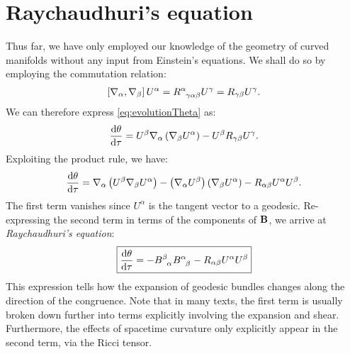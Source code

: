 \documentclass[10pt]{article}
\newcommand{\<}{\langle}
\renewcommand{\>}{\rangle}
\renewcommand{\(}{\left(}
\renewcommand{\)}{\right)}
\renewcommand{\[}{\left[}
\renewcommand{\]}{\right]}
\begin{document}
		\section{Raychaudhuri's equation}
		Thus far, we have only employed our knowledge of the geometry of curved manifolds without any input from Einstein's equations. We shall do so by employing the commutation relation:
		\begin{align}
			\[ \nabla_\alpha, \nabla_\beta \] U^\alpha = \tensor{R}{^\alpha_\gamma_\alpha_\beta} U^\gamma = R_{\gamma\beta} U^\gamma.
		\end{align}
		We can therefore express \eqref{eq:evolutionTheta} as:
		\begin{align}
			\dv{\theta}{\tau} = U^\beta \nabla_\alpha \( \nabla_\beta U^\alpha \) - U^\beta R_{\gamma\beta} U^\gamma.
		\end{align}
		Exploiting the product rule, we have:
		\begin{align}
			\dv{\theta}{\tau} = \nabla_\alpha \( U^\beta \nabla_\beta U^\alpha \) - \( \nabla_\alpha U^\beta \)\( \nabla_\beta U^\alpha \) - R_{\alpha\beta} U^\alpha U^\beta.
		\end{align}
		The first term vanishes since $U^\alpha$ is the tangent vector to a geodesic. Re-expressing the second term in terms of the components of $\vb{B}$, we arrive at \textit{Raychaudhuri's equation}:
		\begin{align}\label{eq:Raychaudhuri}
			\boxed{\dv{\theta}{\tau} = -\tensor{B}{^\beta_\alpha} \tensor{B}{^\alpha_\beta} - R_{\alpha\beta} U^\alpha U^\beta}
		\end{align}
		This expression tells how the expansion of geodesic bundles changes along the direction of the congruence. Note that in many texts, the first term is usually broken down further into terms explicitly involving the expansion and shear. Furthermore, the effects of spacetime curvature only explicitly appear in the second term, via the Ricci tensor.
		
\end{document}
